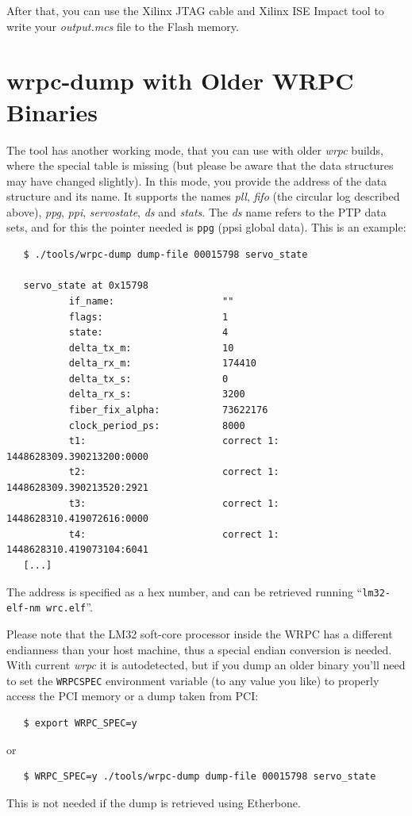 \documentclass[a4paper, 12pt]{article}
\renewcommand{\_}{\underscore\allowbreak}
\begin{document}
After that, you can use the Xilinx JTAG cable and Xilinx ISE Impact tool to
write your \textit{output.mcs} file to the Flash memory.
\newpage
\section{wrpc-dump with Older WRPC Binaries}
\label{appendix:wrpc_dump_with_Older_WRPC_Binaries}

The tool has another working mode, that you can use with older
\textit{wrpc} builds, where the special table is missing (but please be
aware that the data structures may have changed slightly).  In this
mode, you provide the address of the data structure and its name. It
supports the names \textit{pll}, \textit{fifo} (the circular log described
above), \textit{ppg}, \textit{ppi}, \textit{servo\_state}, \textit{ds} and
\textit{stats}. The \textit{ds} name
refers to the PTP data sets, and for this the pointer needed is
\texttt{ppg} (ppsi global data).
This is an example:

\begin{lstlisting}
   $ ./tools/wrpc-dump dump-file 00015798 servo_state

   servo_state at 0x15798
           if_name:                   ""
           flags:                     1
           state:                     4
           delta_tx_m:                10
           delta_rx_m:                174410
           delta_tx_s:                0
           delta_rx_s:                3200
           fiber_fix_alpha:           73622176
           clock_period_ps:           8000
           t1:                        correct 1: 1448628309.390213200:0000
           t2:                        correct 1: 1448628309.390213520:2921
           t3:                        correct 1: 1448628310.419072616:0000
           t4:                        correct 1: 1448628310.419073104:6041
   [...]
\end{lstlisting}

The address is specified as a hex number, and can be retrieved running
``\texttt{lm32-elf-nm  wrc.elf}''.

Please note that the LM32 soft-core processor inside the WRPC has a different
endianness than your host machine, thus a special endian conversion is needed.
With current \textit{wrpc} it is autodetected, but if you dump an older binary
you'll need to set the
\texttt{WRPC\_SPEC} environment variable (to any value you like) to properly
access the PCI memory or a dump taken from PCI:
\begin{lstlisting}
   $ export WRPC_SPEC=y
\end{lstlisting}
or
\begin{lstlisting}
   $ WRPC_SPEC=y ./tools/wrpc-dump dump-file 00015798 servo_state
\end{lstlisting}
This is not needed if the dump is retrieved using Etherbone.
\end{document}
